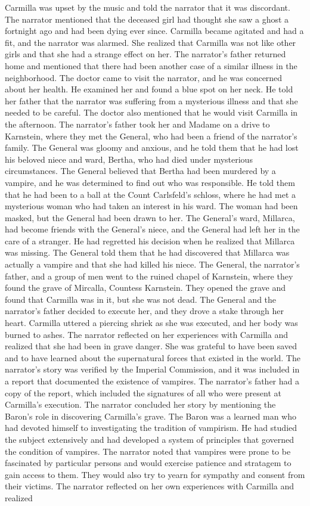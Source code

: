 \documentclass{article} %
\begin{document}
Carmilla was upset by the music and told the narrator that it was discordant. The narrator mentioned that the deceased girl had thought she saw a ghost a fortnight ago and had been dying ever since. Carmilla became agitated and had a fit, and the narrator was alarmed. She realized that Carmilla was not like other girls and that she had a strange effect on her. The narrator's father returned home and mentioned that there had been another case of a similar illness in the neighborhood. The doctor came to visit the narrator, and he was concerned about her health. He examined her and found a blue spot on her neck. He told her father that the narrator was suffering from a mysterious illness and that she needed to be careful. \textcolor{skipred}{The doctor also mentioned that he would visit Carmilla in the afternoon.} The narrator's father took her and Madame on a drive to Karnstein, where they met the General, who had been a friend of the narrator's family. The General was gloomy and anxious, and he told them that he had lost his beloved niece and ward, Bertha, who had died under mysterious circumstances. \textcolor{skipred}{The General believed that Bertha had been murdered by a vampire, and he was determined to find out who was responsible.} He told them that he had been to a ball at the Count Carlsfeld's schloss, where he had met a mysterious woman who had taken an interest in his ward. The woman had been masked, but the General had been drawn to her. \textcolor{skipred}{The General's ward, Millarca, had become friends with the General's niece, and the General had left her in the care of a stranger. He had regretted his decision when he realized that Millarca was missing. The General told them that he had discovered that Millarca was actually a vampire and that she had killed his niece.} The General, the narrator's father, and a group of men went to the ruined chapel of Karnstein, where they found the grave of Mircalla, Countess Karnstein. They opened the grave and found that Carmilla was in it, but she was not dead. The General and the narrator's father decided to execute her, and they drove a stake through her heart. Carmilla uttered a piercing shriek as she was executed, and her body was burned to ashes. The narrator reflected on her experiences with Carmilla and realized that she had been in grave danger. She was grateful to have been saved and to have learned about the supernatural forces that existed in the world. The narrator's story was verified by the Imperial Commission, and it was included in a report that documented the existence of vampires. The narrator's father had a copy of the report, which included the signatures of all who were present at Carmilla's execution. The narrator concluded her story by mentioning the Baron's role in discovering Carmilla's grave. The Baron was a learned man who had devoted himself to investigating the tradition of vampirism. He had studied the subject extensively and had developed a system of principles that governed the condition of vampires. The narrator noted that vampires were prone to be fascinated by particular persons and would exercise patience and stratagem to gain access to them. They would also try to yearn for sympathy and consent from their victims. The narrator reflected on her own experiences with Carmilla and realized 
\end{document}
